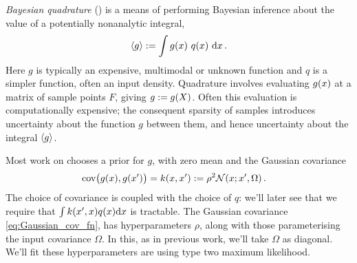 \documentclass[twoside]{article}
\begin{document}
\emph{Bayesian quadrature} (\bq) \citep{BZHermiteQuadrature,BZMonteCarlo} is a means of performing Bayesian inference about the value of a potentially nonanalytic integral, \begin{equation}\label{eq:bq_integral}
\langle g \rangle := \int g(x)~ q(x)~\mathrm{d} x\,.
\end{equation}
Here $g$ is typically an expensive, multimodal or unknown function and $q$ is a simpler function, often an input density. 
Quadrature involves evaluating $g(x)$ at a matrix of sample points $F$, giving $g:= g(X)$. Often this evaluation is computationally expensive; the consequent sparsity of samples introduces uncertainty about the function $g$ between them, and hence uncertainty about the integral $\langle g \rangle$.

Most work on \bq chooses a \gp prior for $g$, with zero mean and the Gaussian covariance 
\begin{align} \label{eq:Gaussian_cov_fn}
\text{cov}\bigl(g(x),g(x')\bigr)=k(x,x') & := \rho^2 \mathcal{N}(x;x',\Omega)\,.
\end{align} 
The choice of covariance is coupled with the choice of $q$: we'll later see that we require that $\int k(x',x) q(x) \mathrm{d}x$ is tractable.
The Gaussian covariance \eqref{eq:Gaussian_cov_fn}, has hyperparameters $\rho$, along with those parameterising the input covariance $\Omega$. In this, as in previous work, we'll take $\Omega$ as diagonal.  We'll fit these hyperparameters are using type two maximum likelihood. 
\end{document}
